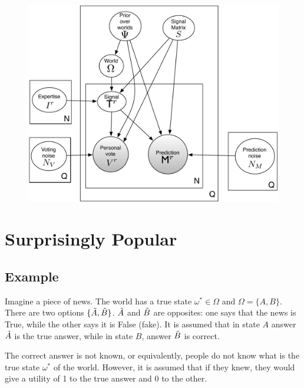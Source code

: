 \documentclass{report}
\theoremstyle{definition}
\begin{document}
\begin{figure}[H]
    \centering
    \includegraphics[width=\textwidth]{generative_individual_expertise_votes_updated.pdf}
\end{figure}

\section{Surprisingly Popular}
\subsection{Example}
Imagine a piece of news. The world has a true state $\omega^* \in \Omega$ and  $\Omega = \{A, B\}$. There are two options $\{ \Tilde{A}, \Tilde{B}\}$. $\Tilde{A}$ and $\Tilde{B}$ are opposites: one says that the news is True, while the other says it is False (fake). It is assumed that in state $A$ answer $\Tilde{A}$ is the true answer, while in state $B$, answer $\Tilde{B}$ is correct.

The correct answer is not known, or equivalently, people do not know what is the true state $\omega^*$ of the world. However, it is assumed that if they knew, they would give a utility of 1 to the true answer and 0 to the other. 
\end{document}
